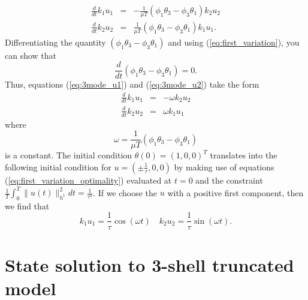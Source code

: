 \begin{eqnarray}
	\frac{d}{dt}k_1 u_{1} &=& - \frac{1}{ \mu T } (\phi_{1}\theta_{3} -\phi_{3}\theta_{1} )k_2 u_{2}
	\label{eq:3mode_u1}\\
	\frac{d}{dt}k_2 u_{2} &=& \frac{1}{ \mu T } (\phi_{1}\theta_{3} -\phi_{3}\theta_{1} )k_1 u_{1}.
	\label{eq:3mode_u2}
\end{eqnarray}
Differentiating the quantity $(\phi_{1}\theta_{3} -\phi_{3}\theta_{1} )$ and using (\ref{eq:first_variation}), you can show that
\begin{equation}
	\frac{d}{dt} (\phi_{1}\theta_{3} -\phi_{3}\theta_{1})=0.
\end{equation}
Thus, equations (\ref{eq:3mode_u1}) and (\ref{eq:3mode_u2}) take the form
\begin{eqnarray}
	\frac{d}{dt}k_1 u_{1} &=& - \omega k_2 u_{2}
	\label{eq:3mode_u1_new}\\
	\frac{d}{dt}k_2 u_{2} &=& \omega  k_1 u_{1}
	\label{eq:3mode_u2_new}
\end{eqnarray}
where
\begin{equation}
	\omega =  \frac{1}{\mu T}(\phi_{1}\theta_{3} -\phi_{3}\theta_{1})
\end{equation}
is a constant. The initial condition $\theta (0) = (1,0,0)^{T}$ translates into the following initial condition for $u=(\pm \frac{1}{\tau}, 0, 0)$ by making use of equations (\ref{eq:first_variation_optimality}) evaluated at $t=0$ and the constraint $\frac{1}{T}\int_{0}^{T}\| u(t)\|^{2}_{h^{1}} dt =  \frac{1}{\tau^2}$. If we choose the $u$ with a positive first component, then we find that
\[
	k_{1}u_{1}=\frac{1}{\tau} \cos(\omega t) \quad
	k_{2}u_{2}=\frac{1}{\tau} \sin(\omega t).
\]

\section{State solution to 3-shell truncated model}
\label{appendix:ss3tm}

